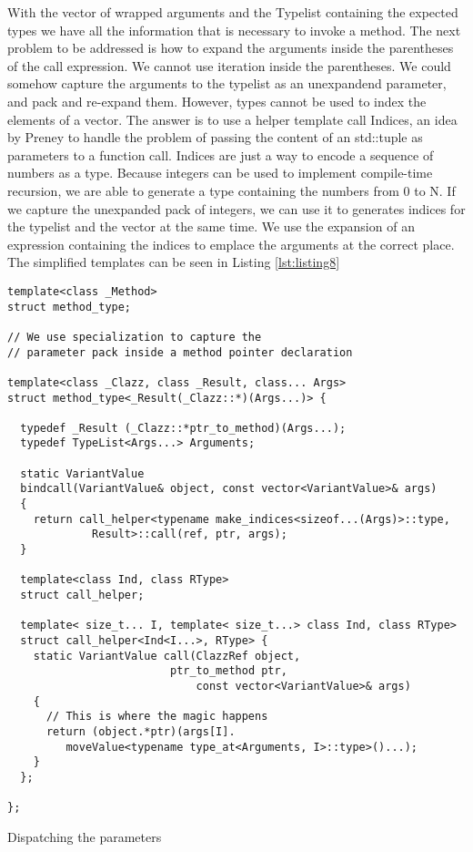 With the vector of wrapped arguments and the Typelist containing the expected types we have all the information that is necessary to
invoke a method. The next problem to be addressed is how to expand the arguments inside the parentheses of the call expression.
We cannot use iteration inside the parentheses. We could somehow capture the arguments to the typelist as an unexpandend parameter,
and pack and re-expand them. However, types cannot be used to index the elements of a vector. The answer is to use a helper template
call Indices, an idea by Preney\cite{Preney} to handle the problem of passing the content of an std::tuple as parameters to a function
call. Indices are just a way to encode a sequence of numbers as a type. Because integers can be used to implement compile-time recursion,
we are able to generate a type containing the numbers from 0 to N. If we capture the unexpanded pack of integers, we can use it to
generates indices for the typelist and the vector at the same time. We use the expansion of an expression containing the indices to
emplace the arguments at the correct place. The simplified templates can be seen in Listing \ref{lst:listing8}

\begin{listing}[H]
\begin{verbatim}
template<class _Method>
struct method_type;

// We use specialization to capture the
// parameter pack inside a method pointer declaration

template<class _Clazz, class _Result, class... Args>
struct method_type<_Result(_Clazz::*)(Args...)> {
  
  typedef _Result (_Clazz::*ptr_to_method)(Args...);
  typedef TypeList<Args...> Arguments;

  static VariantValue
  bindcall(VariantValue& object, const vector<VariantValue>& args)
  {
    return call_helper<typename make_indices<sizeof...(Args)>::type,
             Result>::call(ref, ptr, args);
  }

  template<class Ind, class RType>
  struct call_helper;

  template< size_t... I, template< size_t...> class Ind, class RType>
  struct call_helper<Ind<I...>, RType> {
    static VariantValue call(ClazzRef object,
	                     ptr_to_method ptr,
                             const vector<VariantValue>& args)
    {
      // This is where the magic happens
      return (object.*ptr)(args[I].
         moveValue<typename type_at<Arguments, I>::type>()...);
    }
  };

};
\end{verbatim}
\caption{Dispatching the parameters}
\label{lst:listing8}
\end{listing}

